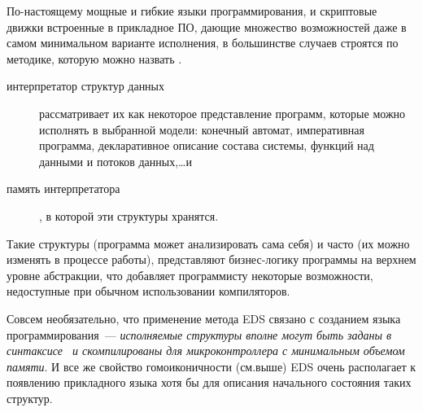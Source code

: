 \label{eds}

По-настоящему мощные и гибкие языки программирования, и скриптовые
движки встроенные в прикладное ПО, дающие множество возможностей даже в самом минимальном варианте
исполнения, в большинстве случаев строятся по методике, которую можно назвать
.

\begin{description}
\item[интерпретатор структур данных] рассматривает их как некоторое
представление программ, которые можно исполнять в выбранной модели: конечный
автомат, императивная программа, декларативное описание состава системы, функций
над данными и потоков данных,\ldots и
\item[память интерпретатора], в которой эти структуры хранятся.
\end{description}

Такие структуры  (программа может анализировать сама себя) и
часто  (их можно изменять в процессе работы), представляют
бизнес-логику программы на верхнем уровне абстракции, что добавляет программисту
некоторые возможности, недоступные при обычном использовании компиляторов.

Совсем необязательно, что применение метода EDS связано с созданием языка
программирования\ --- \emph{исполняемые структуры вполне могут быть заданы в
синтаксисе \emc\ и скомпилированы для микроконтроллера с минимальным объемом
памяти}. И все же свойство гомоиконичности (см.выше) EDS очень располагает к
появлению прикладного языка хотя бы для
описания начального состояния таких структур.
